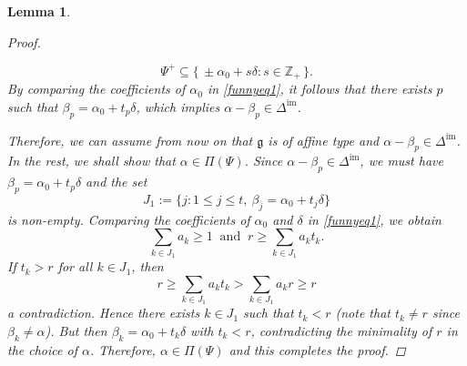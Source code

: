 \documentclass[11pt,reqno]{amsart}
\theoremstyle{plain}
\newtheorem*{lemma}{Lemma}
\theoremstyle{definition}
\theoremstyle{remark}
\newcommand{\lie}[1]{\mathfrak{#1}}
\numberwithin{equation}{section}
\begin{document}
\begin{lemma}
\begin{proof}
\begin{enumerate}[leftmargin=*]
     $$\Psi^{+}\subseteq \{\,\pm \alpha_{0} + s\delta : s\in \mathbb{Z}_{+}\,\}.$$ 
    By comparing the coefficients of $\alpha_0$ in \eqref{funnyeq1}, it follows that there exists $p$ such that $\beta_p=\alpha_0+t_p\delta$, which implies $\alpha-\beta_p\in\Delta^{\mathrm{im}}$. 
    \end{enumerate}
    Therefore, we can assume from now on that $\lie g$ is of affine type and $\alpha-\beta_p\in\Delta^{\mathrm{im}}$. In the rest, we shall show that $\alpha\in\Pi(\Psi)$. Since $\alpha-\beta_p\in\Delta^{\mathrm{im}}$, we must have $\beta_p=\alpha_0+t_p\delta$ and the set
    $$J_1:=\{j:1\le j\le t,\ \beta_j=\alpha_0+t_j\delta\}$$ is non-empty.
    Comparing the coefficients of $\alpha_0$ and $\delta$ in \eqref{funnyeq1}, we obtain
    $$\sum_{k\in J_1}a_k\geq 1\ \text{ and }\ r\geq\sum_{k\in J_1}a_kt_k.$$ If $t_k>r$ for all $k\in J_1$, then
$$r\geq\sum_{k\in J_1}a_kt_k>\sum_{k\in J_1}a_kr\geq r$$ a contradiction. Hence there exists $k\in J_1$ such that $t_k<r$ (note that $t_k\neq r$ since $\beta_k\neq\alpha$). But then $\beta_k=\alpha_0+t_k\delta$ with $t_k<r$, contradicting the minimality of $r$ in the choice of $\alpha$. Therefore, $\alpha\in\Pi(\Psi)$ and this completes the proof.

\end{proof}
\end{lemma}
\end{document}

